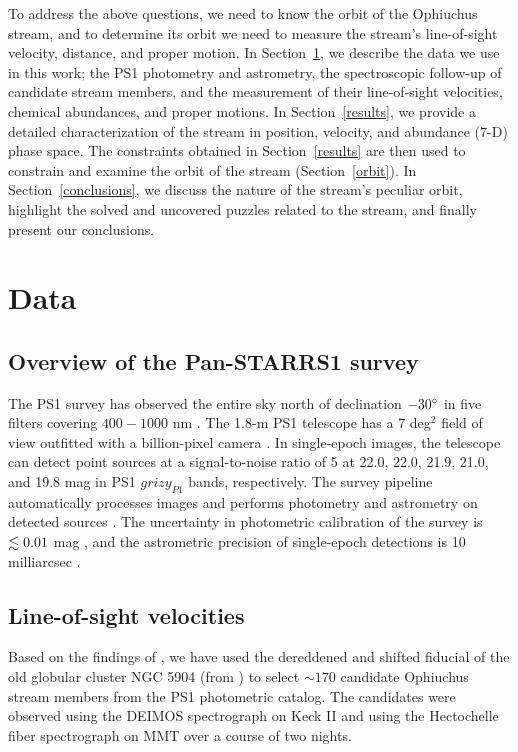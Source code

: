 \documentclass[iop]{emulateapj}
\begin{document}
To address the above questions, we need to know the orbit of the Ophiuchus
stream, and to determine its orbit we need to measure the stream's line-of-sight
velocity, distance, and proper motion. In Section~\ref{data}, we describe the
data we use in this work; the PS1 photometry and astrometry, the spectroscopic
follow-up of candidate stream members, and the measurement of their
line-of-sight velocities, chemical abundances, and proper motions. In
Section~\ref{results}, we provide a detailed characterization of the stream in
position, velocity, and abundance (7-D) phase space. The constraints obtained in
Section~\ref{results} are then used to constrain and examine the orbit of the
stream (Section~\ref{orbit}). In Section~\ref{conclusions}, we discuss the
nature of the stream's peculiar orbit, highlight the solved and uncovered
puzzles related to the stream, and finally present our conclusions.

\section{Data}\label{data}

\subsection{Overview of the Pan-STARRS1 survey}\label{PS1}

The PS1 survey has observed the entire sky north of declination $-30\mbox{$^\circ$}$ in
five filters covering $400-1000$ nm \citep{stu10, ton12}. The 1.8-m PS1
telescope has a 7 deg$^2$ field of view outfitted with a billion-pixel camera
\citep{hod04, ona08, to09}. In single-epoch images, the telescope can detect
point sources at a signal-to-noise ratio of 5 at 22.0, 22.0, 21.9, 21.0, and
19.8 mag in PS1 $grizy_{P1}$ bands, respectively. The survey pipeline
automatically processes images and performs photometry and astrometry on
detected sources \citep{mag06, mag07}. The uncertainty in photometric
calibration of the survey is $\lesssim0.01$ mag \citep{sch12}, and the astrometric
precision of single-epoch detections is 10 milliarcsec
\citep[hereafter mas]{mag08}.

\subsection{Line-of-sight velocities}

Based on the findings of \citet{ber14b}, we have used the dereddened and shifted
fiducial of the old globular cluster NGC 5904 (from \citealt{ber14a}) to select
$\sim170$ candidate Ophiuchus stream members from the PS1 photometric catalog.
The candidates were observed using the DEIMOS spectrograph on Keck II
\citep{fab02} and using the Hectochelle fiber spectrograph on MMT \citep{sze11}
over a course of two nights.
\end{document}
